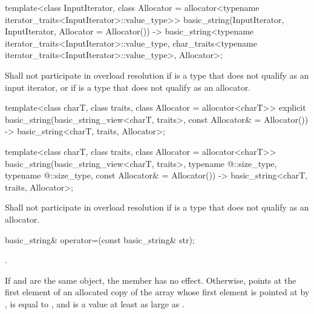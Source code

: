 \begin{itemdecl}
template<class InputIterator,
         class Allocator = allocator<typename iterator_traits<InputIterator>::value_type>>
  basic_string(InputIterator, InputIterator, Allocator = Allocator())
    -> basic_string<typename iterator_traits<InputIterator>::value_type,
                    char_traits<typename iterator_traits<InputIterator>::value_type>,
                    Allocator>;
\end{itemdecl}

\begin{itemdescr}
\pnum
\remarks Shall not participate in overload resolution if
 is a type that does not qualify as an input iterator,
or if  is a type that does not qualify as an allocator.
\end{itemdescr}

\begin{itemdecl}
template<class charT,
         class traits,
         class Allocator = allocator<charT>>
  explicit basic_string(basic_string_view<charT, traits>, const Allocator& = Allocator())
    -> basic_string<charT, traits, Allocator>;

template<class charT,
         class traits,
         class Allocator = allocator<charT>>
  basic_string(basic_string_view<charT, traits>,
               typename @\seebelow@::size_type, typename @\seebelow@::size_type,
               const Allocator& = Allocator())
    -> basic_string<charT, traits, Allocator>;
\end{itemdecl}

\begin{itemdescr}
\pnum
\remarks Shall not participate in overload resolution if
 is a type that does not qualify as
an allocator.
\end{itemdescr}

%
\begin{itemdecl}
basic_string& operator=(const basic_string& str);
\end{itemdecl}

\begin{itemdescr}
\pnum
\returns
{}.

\pnum
\postconditions
If  and  are the same object, the member has no effect.
Otherwise,
 points at the first element of an allocated copy
of the array whose first element is pointed at by ,
 is equal to , and
 is a value at least as large as .
\end{itemdescr}

